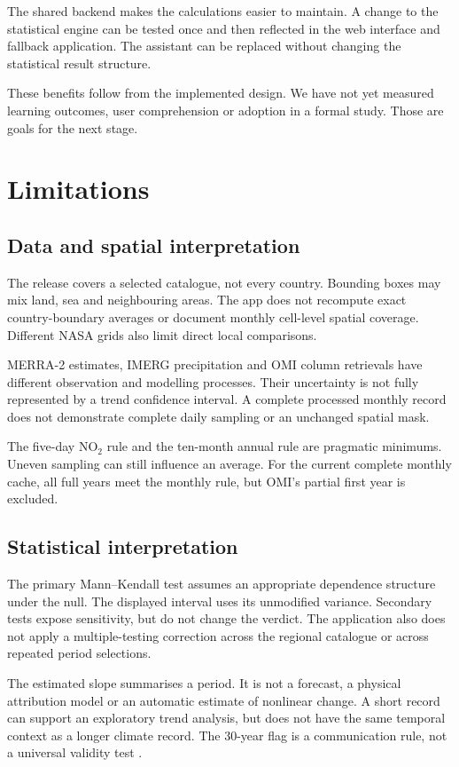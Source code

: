 \documentclass[10pt,a4paper,twocolumn]{article}
\begin{document}
The shared backend makes the calculations easier to maintain. A change to the statistical engine can be tested once and then reflected in the web interface and fallback application. The assistant can be replaced without changing the statistical result structure.

These benefits follow from the implemented design. We have not yet measured learning outcomes, user comprehension or adoption in a formal study. Those are goals for the next stage.

\section{Limitations}
\subsection{Data and spatial interpretation}
The release covers a selected catalogue, not every country. Bounding boxes may mix land, sea and neighbouring areas. The app does not recompute exact country-boundary averages or document monthly cell-level spatial coverage. Different NASA grids also limit direct local comparisons.

MERRA-2 estimates, IMERG precipitation and OMI column retrievals have different observation and modelling processes. Their uncertainty is not fully represented by a trend confidence interval. A complete processed monthly record does not demonstrate complete daily sampling or an unchanged spatial mask.

The five-day NO$_2$ rule and the ten-month annual rule are pragmatic minimums. Uneven sampling can still influence an average. For the current complete monthly cache, all full years meet the monthly rule, but OMI's partial first year is excluded.

\subsection{Statistical interpretation}
The primary Mann--Kendall test assumes an appropriate dependence structure under the null. The displayed interval uses its unmodified variance. Secondary tests expose sensitivity, but do not change the verdict. The application also does not apply a multiple-testing correction across the regional catalogue or across repeated period selections.

The estimated slope summarises a period. It is not a forecast, a physical attribution model or an automatic estimate of nonlinear change. A short record can support an exploratory trend analysis, but does not have the same temporal context as a longer climate record. The 30-year flag is a communication rule, not a universal validity test \cite{wmo}.
\end{document}
